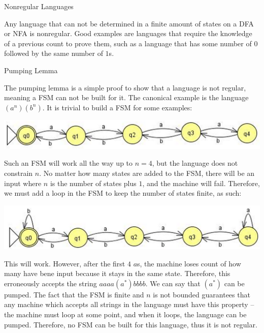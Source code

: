 \documentclass[2pt]{scrartcl}
\makeatletter
\renewcommand{\section}{\@startsection{section}{1}{0mm}
  {-1ex plus -.5ex minus -.2ex}
  {0.5ex plus .2ex}
{\normalfont\large\bfseries}}
\renewcommand{\subsection}{\@startsection{subsection}{2}{0mm}
  {-1explus -.5ex minus -.2ex}
  {0.5ex plus .2ex}
{\normalfont\normalsize\bfseries}}
\makeatother
\begin{document}
\begin{multicols}{6}
  \section{Nonregular Languages}

  Any language that can not be determined in a finite amount of states on a DFA or NFA is nonregular. Good examples are languages that require the knowledge of a previous count to prove them, such as a language that has some number of $0$ followed by the same number of $1$s.

  \subsection{Pumping Lemma}

  The pumping lemma is a simple proof to show that a language is not regular, meaning a FSM can not be built for it. The canonical example is the language $(a^n)(b^n)$. It is trivial to build a FSM for some examples:

  \includegraphics[scale=0.25]{simple_pumping_fsm.png}

  Such an FSM will work all the way up to $n = 4$, but the language does not constrain $n$. No matter how many states are added to the FSM, there will be an input where $n$ is the number of states plus $1$, and the machine will fail. Therefore, we must add a loop in the FSM to keep the number of states finite, as such:

  \includegraphics[scale=0.25]{loop_pumping_fsm.png}

  This will work. However, after the first $4$ $a$s, the machine loses count of how many have bene input because it stays in the same state. Therefore, this erroneously accepts the string $aaaa(a^*)bbbb$. We can say that $(a^*)$ can be pumped. The fact that the FSM is finite and $n$ is not bounded guarantees that any machine which accepts all strings in the language must have this property -- the machine must loop at some point, and when it loops, the language can be pumped. Therefore, no FSM can be built for this language, thus it is not regular.


\end{multicols}
\end{document}
